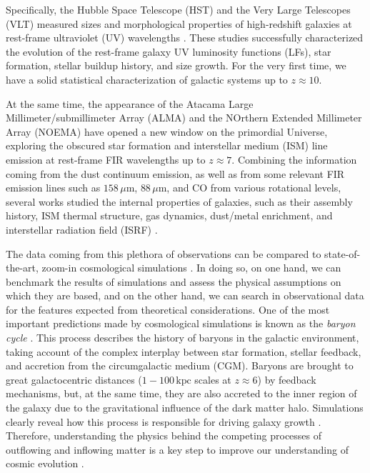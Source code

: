 \documentclass[a4paper, 12pt]{article}
\begin{document}
Specifically, the Hubble Space Telescope (HST) and the Very Large Telescopes (VLT) measured sizes and morphological properties of high-redshift galaxies at rest-frame ultraviolet (UV) wavelengths \citep{oesch2009structure,Shibuya:2015qfa, bouwens2017z, kawamata2018size}. These studies successfully characterized the evolution of the rest-frame galaxy UV luminosity functions (LFs), star formation, stellar buildup history, and size growth. For the very first time, we have a solid statistical characterization of galactic systems up to $z\approx 10$. 

At the same time, the appearance of the Atacama Large Millimeter/submillimeter Array (ALMA) and the NOrthern Extended Millimeter Array (NOEMA) have opened a new window on the primordial Universe, exploring the obscured star formation and interstellar medium (ISM) line emission at rest-frame FIR wavelengths up to $z\approx7$. Combining the information coming from the dust continuum emission, as well as from some relevant FIR emission lines such as \CII $158 \,\mu\mathrm{m}$, \OIII $88 \,\mu\mathrm{m}$, and CO from various rotational levels, several works studied the internal properties of galaxies, such as their assembly history, ISM thermal structure, gas dynamics, dust/metal enrichment, and interstellar radiation field (ISRF) \citep{maiolino2015,capak2015,pentericci2016, matthee2017, carniani2018,Hashimoto2018, gallerani:2018}.


The data coming from this plethora of observations can be compared to state-of-the-art, zoom-in cosmological simulations \citep{pallottini2017, Hopkins18, pallottini:2019}. In doing so, on one hand, we can benchmark the results of simulations and assess the physical assumptions on which they are based, and on the other hand, we can search in observational data for the features expected from theoretical considerations. One of the most important predictions made by cosmological simulations is known as the \textit{baryon cycle} \citep{peroux2020cosmic}. This process describes the history of baryons in the galactic environment, taking account of the complex interplay between star formation, stellar feedback, and accretion from the circumgalactic medium (CGM). Baryons are brought to great galactocentric distances ($1-100\,\mathrm{kpc}$ scales at $z\approx 6$) by feedback mechanisms, but, at the same time, they are also accreted to the inner region of the galaxy due to the gravitational influence of the dark matter halo. Simulations clearly reveal how this process is responsible for driving galaxy growth \citep{tumlison}. Therefore, understanding the physics behind the competing processes of outflowing and inflowing matter is a key step to improve our understanding of cosmic evolution \citep{2005ARA&A..43..769V}.
\end{document}
